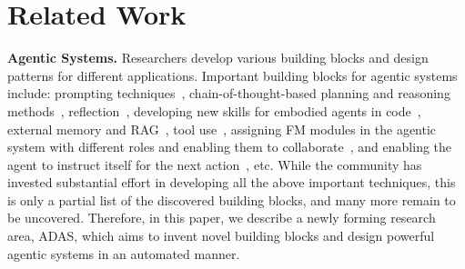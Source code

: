 \documentclass{article}
\newcommand{\problem}{ADAS\xspace}
\begin{document}
\section{Related Work}

\label{section:related_work}

\noindent\textbf{Agentic Systems.}\hspace{0.5em} Researchers develop various building blocks and design patterns for different applications.
Important building blocks for agentic systems include: prompting techniques~\citep{chen2023unleashing,schulhoff2024prompt}, chain-of-thought-based planning and reasoning methods~\citep{wei2022chain,yao2023react,hu2023ThoughtCloning}, reflection~\citep{madaan2024self,shinn2024reflexion}, developing new skills for embodied agents in code~\citep{wang2023voyager,vemprala2023chatgpt_robotics}, external memory and RAG~\citep{zhang2024memroysurvey,lewis2020rag}, tool use~\citep{qu2024toolsurvey,schick2023toolformer,nakano2021webgpt}, assigning FM modules in the agentic system with different roles and enabling them to collaborate~\citep{hong2023metagpt,wu2023autogen,qian2023communicative,xu2023expertprompting,qian2024scaling}, and enabling the agent to instruct itself for the next action~\citep{autogpt}, etc. While the community has invested substantial effort in developing all the above important techniques, this is only a partial list of the discovered building blocks, and many more remain to be uncovered. Therefore, in this paper, we describe a newly forming research area, \problem, which aims to invent novel building blocks and design powerful agentic systems in an automated manner.
\end{document}
